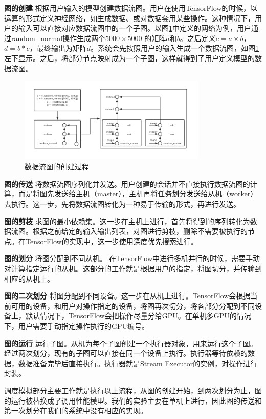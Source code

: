     {\bfseries 图的创建} 根据用户输入的模型创建数据流图。用户在使用TensorFlow的时候，以运算的形式定义神经网络，如生成数据、或对数据套用某些操作。这种情况下，用户的输入可以直接对应数据流图中的一个子图。以图\ref{fig:dag_mat}中定义的网络为例，用户通过random\_normal操作生成两个$ 5000 \times 5000 $ 的矩阵$ a $和$ b $。之后定义$ c = a \times b $，$ d = b * c $，最终输出为矩阵$ d $。系统会先按照用户的输入生成一个数据流图，如图\ref{fig:dag_mat}左下显示。之后，将部分节点映射成为一个子图，这样就得到了用户定义模型的数据流图。

    \begin{figure}[!htbp]
        \centering
        \includegraphics[width=0.8\textwidth]{figures/dag_mat.jpg}
        \caption{数据流图的创建过程}
        \label{fig:dag_mat}
    \end{figure}

    {\bfseries 图的传送} 将数据流图序列化并发送。用户创建的会话并不直接执行数据流图的计算，而是将图先发送给主机（master），主机再将任务划分发送给从机（worker）去执行。这一步，先将数据流图转化为一种易于传输的形式，再进行发送。
    
    {\bfseries 图的剪枝} 求图的最小依赖集。这一步在主机上进行，首先将得到的序列转化为数据流图。根据之前给定的输入输出列表，对图进行剪枝，删除不需要被执行的节点。在TensorFlow的实现中，这一步使用深度优先搜索进行。

    {\bfseries 图的划分} 将图分配到不同从机。 在TensorFlow中进行多机并行的时候，需要手动对计算指定运行的从机。这部分的工作就是根据用户的指定，将图切分，并传输到相应的从机上。

    {\bfseries 图的二次划分} 将图分配到不同设备。这一步在从机上进行。TensorFlow会根据当前可用的设备，和用户对操作指定的设备，将图再次切分，将各部分分配到不同设备上，默认情况下，TensorFlow会把操作尽量分给GPU。在单机多GPU的情况下，用户需要手动指定操作执行的GPU编号。
    
    {\bfseries 图的运行} 运行子图。从机为每个子图创建一个执行器对象，用来运行这个子图。经过两次划分，现有的子图可以直接在同一个设备上执行。执行器等待依赖的数据，数据准备完毕后直接执行。执行器就是Stream Executor的实例，对操作进行封装。
    
    调度模拟部分主要工作就是执行以上流程，从图的创建开始，到两次划分为止，图的运行被替换成了调用性能模型。我们的实验主要在单机上进行，因此图的传送和第一次划分在我们的系统中没有相应的实现。
